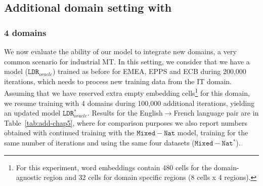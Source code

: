 \subsection{Additional domain setting with  \label{ssec:additional_domain-chap5}}
\subsubsection{4 domains}
We now evaluate the ability of our model to integrate new domains, a very common scenario for industrial MT. In this setting, we consider that we have a model ($\mathtt{LDR}_{oracle}$) trained as before for EMEA, EPPS and ECB during 200,000 iterations, which needs to process new training data from the IT domain. Assuming that we have reserved extra empty embedding cells\footnote{For this experiment, word embeddings contain 480 cells for the domain-agnostic region and 32 cells for domain specific regions (8 cells x 4 regions).} for this domain, we resume training with 4 domains during 100,000 additional iterations, yielding an updated model  $\mathtt{LDR}_{oracle}^*$. Results for the English$\rightarrow$French language pair are in Table~\ref{tab:add-chap5}, where for comparison purposes we also report numbers obtained with continued training with the $\mathtt{Mixed-Nat}$ model, training for the same number of iterations and using the same four datasets ($\mathtt{Mixed-Nat}^*$).

\begin{table}[!h]
\begin{center}
\end{center}
\caption{BLEU scores for the Transformer architecture when including IT as additional domain \label{tab:add-chap5}}
\end{table}

